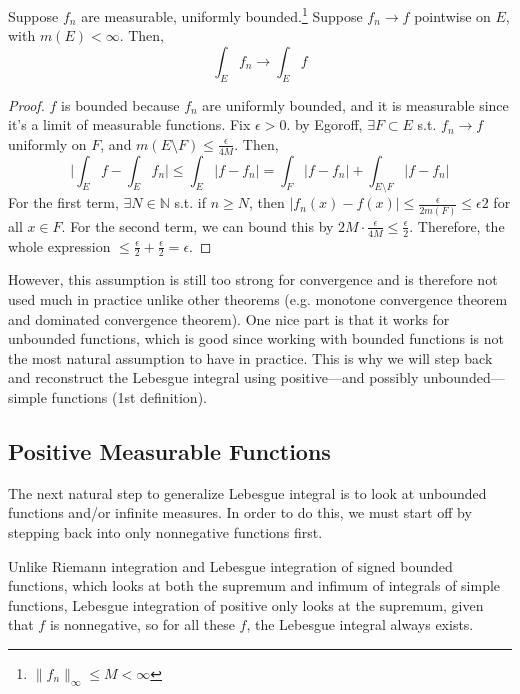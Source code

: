   \begin{theorem}
    Suppose $f_n$ are measurable, uniformly bounded.\footnote{$\|f_n\|_\infty \leq M < \infty$} Suppose $f_n \to f$ pointwise on $E$, with $m(E) < \infty$. Then, 
    \begin{equation}
      \int_E f_n \to \int_E f
    \end{equation}
  \end{theorem}
  \begin{proof}
    $f$ is bounded because $f_n$ are uniformly bounded, and it is measurable since it's a limit of measurable functions. Fix $\epsilon > 0$. by Egoroff, $\exists F \subset E$ s.t. $f_n \to f$ uniformly on $F$, and $m(E \setminus F) \leq \frac{\epsilon}{4M}$. Then, 
    \begin{equation}
      \bigg| \int_E f - \int_E f_n \bigg| \leq \int_E |f - f_n| = \int_F |f - f_n| + \int_{E \setminus F} |f - f_n| 
    \end{equation}
    For the first term, $\exists N \in \mathbb{N}$ s.t. if $n \geq N$, then $|f_n (x) - f(x)| \leq \frac{\epsilon}{2 m(F)} \leq \epsilon{2}$ for all $x \in F$. For the second term, we can bound this by $2M \cdot \frac{\epsilon}{4M} \leq \frac{\epsilon}{2}$. Therefore, the whole expression $\leq \frac{\epsilon}{2} + \frac{\epsilon}{2} = \epsilon$. 
  \end{proof}

  However, this assumption is still too strong for convergence and is therefore not used much in practice unlike other theorems (e.g. monotone convergence theorem and dominated convergence theorem). One nice part is that it works for unbounded functions, which is good since working with bounded functions is not the most natural assumption to have in practice. This is why we will step back and reconstruct the Lebesgue integral using positive---and possibly unbounded---simple functions (1st definition). 

\subsection{Positive Measurable Functions} 

  The next natural step to generalize Lebesgue integral is to look at unbounded functions and/or infinite measures. In order to do this, we must start off by stepping back into only nonnegative functions first.

  Unlike Riemann integration and Lebesgue integration of signed bounded functions, which looks at both the supremum and infimum of integrals of simple functions, Lebesgue integration of positive only looks at the supremum, given that $f$ is nonnegative, so for all these $f$, the Lebesgue integral always exists. 

